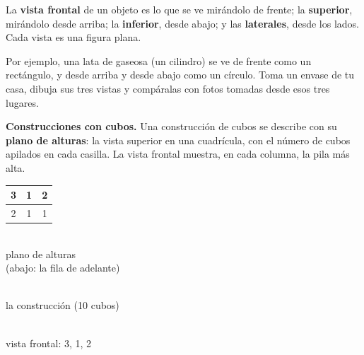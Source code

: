 \documentclass[11pt]{article}
\newcommand{\cubo}[3]{%
  \filldraw[fill=white] (#1,#2,#3) -- ++(1,0,0) -- ++(0,0,1) -- ++(-1,0,0) -- cycle;
  \filldraw[fill=gray!25] (#1,#2,#3+1) -- ++(1,0,0) -- ++(0,1,0) -- ++(-1,0,0) -- cycle;
  \filldraw[fill=gray!55] (#1+1,#2,#3) -- ++(0,1,0) -- ++(0,0,1) -- ++(0,-1,0) -- cycle;}
\begin{document}
\begin{definicion}[Vistas]
La \textbf{vista frontal} de un objeto es lo que se ve mirándolo de frente; la \textbf{superior},
mirándolo desde arriba; la \textbf{inferior}, desde abajo; y las \textbf{laterales}, desde los
lados. Cada vista es una figura plana.
\end{definicion}

Por ejemplo, una lata de gaseosa (un cilindro) se ve de frente como un rectángulo, y desde arriba
y desde abajo como un círculo. Toma un envase de tu casa, dibuja sus tres vistas y compáralas con
fotos tomadas desde esos tres lugares.

\textbf{Construcciones con cubos.} Una construcción de cubos se describe con su \textbf{plano de
alturas}: la vista superior en una cuadrícula, con el número de cubos apilados en cada casilla.
La vista frontal muestra, en cada columna, la pila más alta.

\begin{ejemplo}
\begin{center}
\begin{minipage}{0.3\linewidth}\centering
\renewcommand{\arraystretch}{1.3}
\begin{tabular}{|c|c|c|}\hline 3 & 1 & 2\\\hline 2 & 1 & 1\\\hline\end{tabular}\\[2pt]
{\footnotesize plano de alturas\\(abajo: la fila de adelante)}
\end{minipage}\hfill
\begin{minipage}{0.36\linewidth}\centering
{}\\
{\footnotesize la construcción (10 cubos)}
\end{minipage}\hfill
\begin{minipage}{0.3\linewidth}\centering
{}\\
{\footnotesize vista frontal: 3, 1, 2}
\end{minipage}
\end{center}
\end{ejemplo}
\end{document}
